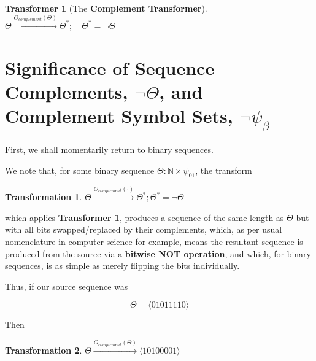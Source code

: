 \documentclass[a4paper, 18pt]{book} %
\newtheorem{trans}{Transformation}
\newtheorem{transf}{Transformer}
\begin{document}
\vspace{1em}

\begin{transf}[The \textbf{Complement Transformer}]
\label{TRANSCOMPL}
$ $\\
$\Theta \xrightarrow{O_{complement}(\Theta)} \Theta^*; \quad \Theta^* = \lnot\Theta$\\
\end{transf}

\vspace{1em}


\section{Significance of Sequence Complements, $\lnot\Theta$, and Complement Symbol Sets, $\lnot\psi_\beta$}
\label{SECSIGCOMPLE}

First, we shall momentarily return to binary sequences. 

We note that, for some binary sequence $\Theta: \mathbb{N} \times \psi_{01}$, the transform

\vspace{1em}
\begin{trans}
$\Theta \xrightarrow{O_{complement}(\cdot)} \Theta^*; \Theta^* = \lnot\Theta$
\end{trans}
\vspace{1em}

which applies \textbf{\hyperref[TRANSCOMPL]{Transformer \ref{TRANSCOMPL}}}, produces a sequence of the same length as $\Theta$ but with all bits swapped/replaced by their complements, which, as per usual nomenclature in computer science for example, means the resultant sequence is produced from the source via a \textbf{bitwise NOT operation}, and which, for binary sequences, is as simple as merely flipping the bits individually.

Thus, if our source sequence was 

\vspace{1em}

\begin{equation}
\Theta = \langle 0 1 0 1 1 1 1 0 \rangle
\end{equation}

\vspace{1em}

Then 

\vspace{1em}

\begin{trans}
$\Theta \xrightarrow{O_{complement}(\Theta)}  \langle 1 0 1 0 0 0 0 1 \rangle$
\end{trans}
\end{document}
